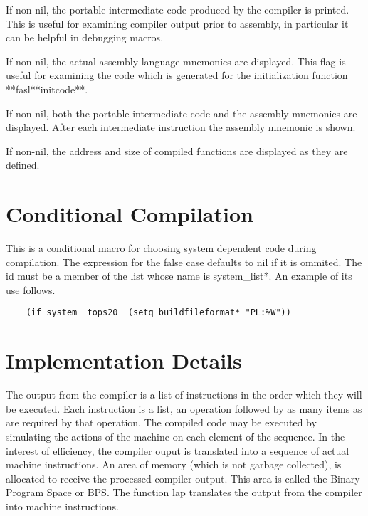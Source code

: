 {
    If  non-nil,  the portable intermediate code produced by the
    compiler is printed. This is useful for  examining  compiler
    output prior to assembly, in particular it can be helpful in
    debugging macros.
}

{
    If  non-nil,  the  actual  assembly  language  mnemonics are
    displayed. This flag is useful for examining the code  which
    is     generated    for    the    initialization    function
    **fasl**initcode**.
}

{
    If non-nil, both the  portable  intermediate  code  and  the
    assembly  mnemonics  are displayed.  After each intermediate
    instruction the assembly mnemonic is shown.
}

{
    If non-nil, the address and size of compiled  functions  are
    displayed as they are defined.
}

\section{Conditional Compilation}


{    This  is  a  conditional macro for choosing system dependent
    code during compilation.  The expression for the false  case
    defaults to nil if it is ommited. The id must be a member of
    the  list whose name is system\_list*. An example of its use
    follows.
}

\begin{verbatim}
    (if_system  tops20  (setq buildfileformat* "PL:%W"))
\end{verbatim}
\section{Implementation Details}

  The output from the compiler is a list of instructions in  the
order  which  they will be executed. Each instruction is a list,
an operation followed by as many items as are required  by  that
operation.  The  compiled code may be executed by simulating the
actions of the machine on each element of the sequence.  In  the
interest  of efficiency, the compiler ouput is translated into a
sequence of actual machine instructions. An area of memory
(which  is  not  garbage collected), is allocated to  receive
the processed compiler  output.  This  area  is   called  the 
Binary Program  Space  or  BPS.  The function  lap translates
the output from the compiler into machine  instructions.

